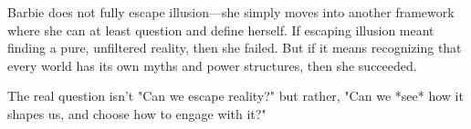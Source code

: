 Barbie does not fully escape illusion—she simply moves into another framework where she can at least question and define herself. If escaping illusion meant finding a pure, unfiltered reality, then she failed. But if it means recognizing that every world has its own myths and power structures, then she succeeded.  

The real question isn’t "Can we escape reality?" but rather, "Can we *see* how it shapes us, and choose how to engage with it?"
